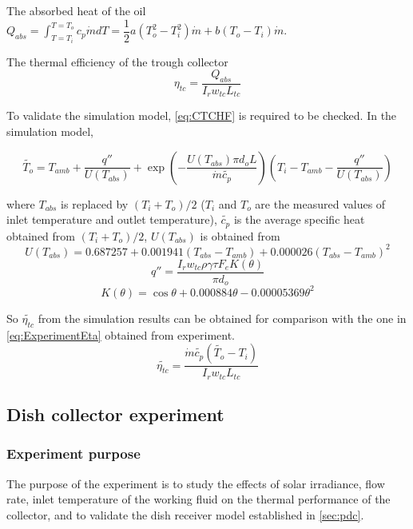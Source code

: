 The absorbed heat of the oil $Q_{abs} = \int_{T=T_i}^{T = T_o}c_p\dot{m}dT = \dfrac{1}{2}a(T_o^2 - T_i^2)\dot{m} + b (T_o - T_i)\dot{m}$.

The thermal efficiency of the trough collector 
\begin{equation}
	\eta_{tc} = \dfrac{Q_{abs}}{I_rw_{tc}L_{tc}}
	\label{eq:ExperimentEta}
\end{equation}

To validate the simulation model, \autoref{eq:CTCHF} is required to be checked. In the simulation model,

\begin{equation}
	\widetilde{T_{o}}=T_{amb} + \dfrac{q''}{U(T_{abs})} + \exp(-\frac{U(T_{abs})\pi d_o L}{\dot{m}\widetilde{c_p}})(T_{i}-T_{amb}-\dfrac{q''}{U(T_{abs})})
	\label{eq:CheckT_o}
\end{equation}

where $T_{abs}$ is replaced by $(T_i + T_o)/2$ ($T_i$ and $T_o$ are the measured values of inlet temperature and outlet temperature), $\widetilde{c_p}$ is the average specific heat obtained from $(T_i + T_o)/2$,
$U(T_{abs})$ is obtained from~\cite{Romero2007}
\begin{equation}
	U(T_{abs}) = 0.687257 + 0.001941(T_{abs} - T_{amb}) + 0.000026(T_{abs} - T_{amb})^2
	\label{eq:U_T_abs}
\end{equation}
\begin{equation}
	q'' = \frac{I_r w_{tc} \rho \gamma \tau F_e K(\theta)}{\pi d_o}
\end{equation}
\begin{equation}
	K(\theta) = \cos\theta+0.000884\theta-0.00005369\theta^2
\end{equation}

So $\widetilde{\eta_{tc}}$ from the simulation results can be obtained for comparison with the one in \autoref{eq:ExperimentEta} obtained from experiment.
\begin{equation}
	\widetilde{\eta_{tc}} = \dfrac{\dot{m}\widetilde{c_p}(\widetilde{T_o}-T_i)}{I_rw_{tc}L_{tc}}
\end{equation}
	
\subsection{Dish collector experiment}
\subsubsection{Experiment purpose}
The purpose of the experiment is to study the effects of solar irradiance, flow rate, inlet temperature of the working fluid on the thermal performance of the collector, and to validate the dish receiver model established in \autoref{sec:pdc}.

